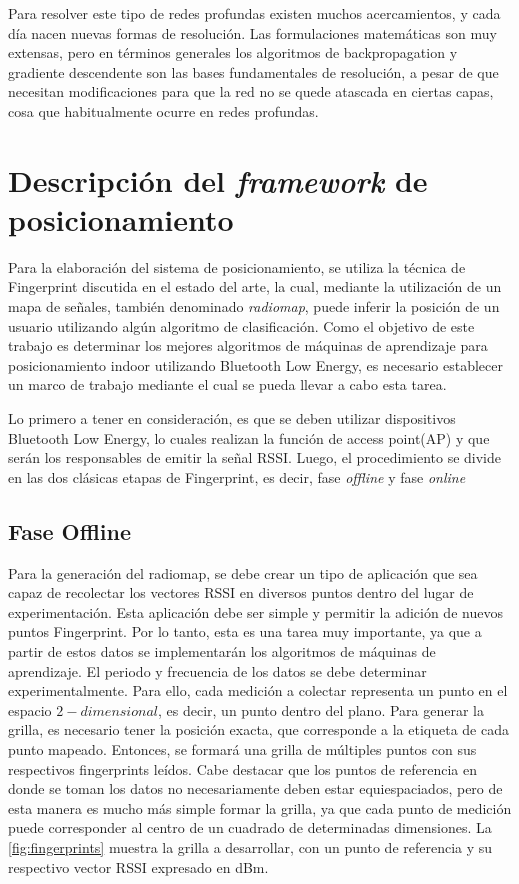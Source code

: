Para resolver este tipo de redes profundas existen muchos acercamientos, y cada día nacen nuevas formas de resolución. Las formulaciones matemáticas son muy extensas, pero en términos generales los algoritmos de backpropagation y gradiente descendente son las bases fundamentales de resolución, a pesar de que necesitan modificaciones para que la red no se quede atascada en ciertas capas, cosa que habitualmente ocurre en redes profundas.


\section{Descripción del \textit{framework} de posicionamiento}

Para la elaboración del sistema de posicionamiento, se utiliza la técnica de Fingerprint discutida en el estado del arte, la cual, mediante la utilización de un mapa de señales, también denominado \textit{radiomap}, puede inferir la posición de un usuario utilizando algún algoritmo de clasificación. Como el objetivo de este trabajo es determinar los mejores algoritmos de máquinas de aprendizaje para posicionamiento indoor utilizando Bluetooth Low Energy, es necesario establecer un marco de trabajo mediante el cual se pueda llevar a cabo esta tarea.

Lo primero a tener en consideración, es que se deben utilizar dispositivos Bluetooth Low Energy, lo cuales realizan la función de access point(AP) y que serán los responsables de emitir la señal RSSI. Luego, el procedimiento se divide en las dos clásicas etapas de Fingerprint, es decir, fase \textit{offline} y fase \textit{online}

\subsection{Fase Offline}

Para la generación del radiomap, se debe crear un tipo de aplicación que sea capaz de recolectar los vectores RSSI en diversos puntos dentro del lugar de experimentación. Esta aplicación debe ser simple y permitir la adición de nuevos puntos Fingerprint. Por lo tanto, esta es una tarea muy importante, ya que a partir de estos datos se implementarán los algoritmos de máquinas de aprendizaje. El periodo y frecuencia de los datos se debe determinar experimentalmente. Para ello, cada medición a colectar representa un punto en el espacio $2-dimensional$, es decir, un punto dentro del plano. Para generar la grilla, es necesario tener la posición exacta, que corresponde a la etiqueta de cada punto mapeado. Entonces, se formará una grilla de múltiples puntos con sus respectivos fingerprints leídos. Cabe destacar que los puntos de referencia en donde se toman los datos no necesariamente deben estar equiespaciados, pero de esta manera es mucho más simple formar la grilla, ya que cada punto de medición puede corresponder al centro de un cuadrado de determinadas dimensiones. La \autoref{fig:fingerprints} muestra la grilla a desarrollar, con un punto de referencia y su respectivo vector RSSI expresado en dBm.

